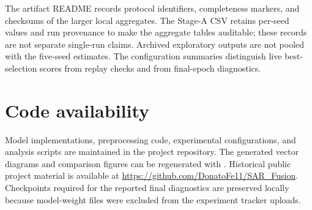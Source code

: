 The artifact README records protocol identifiers, completeness markers, and
checksums of the larger local aggregates. The Stage-A CSV retains per-seed
values and run provenance to make the aggregate tables auditable; these
records are not separate single-run claims. Archived exploratory outputs are
not pooled with the five-seed estimates. The configuration summaries distinguish
live best-selection scores from replay checks and from final-epoch diagnostics.

\section{Code availability}

Model implementations, preprocessing code, experimental configurations, and
analysis scripts are maintained in the project repository. The generated
vector diagrams and comparison figures can be regenerated with
. Historical public
project material is available at
\url{https://github.com/DonatoFe11/SAR_Fusion}. Checkpoints required for the
reported final diagnostics are preserved locally because model-weight files
were excluded from the experiment tracker uploads.
